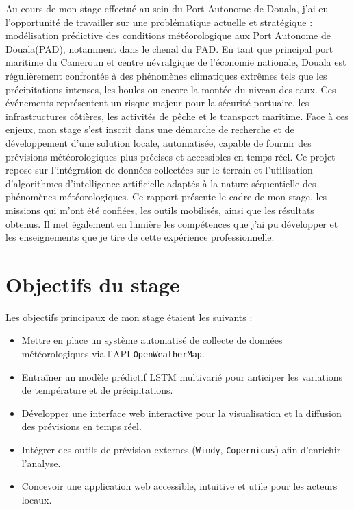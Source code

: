 \documentclass[a4paper,12pt,openany]{report}
\begin{document}
Au cours de mon stage effectué au sein du Port Autonome de Douala, j’ai eu l’opportunité de travailler sur une problématique  actuelle et stratégique : modélisation prédictive des conditions météorologique aux Port Autonome de Douala(PAD), notamment dans le chenal du PAD. En tant que principal port maritime du Cameroun et centre névralgique de l’économie nationale, Douala est régulièrement confrontée à des phénomènes climatiques extrêmes tels que les précipitations intenses, les houles ou encore la montée du niveau des eaux. Ces événements représentent un risque majeur pour la sécurité portuaire, les infrastructures côtières, les activités de pêche et le transport maritime.
Face à ces enjeux, mon stage s’est inscrit dans une démarche de recherche et de développement d’une solution locale, automatisée, capable de fournir des prévisions météorologiques plus précises et accessibles en temps réel. Ce projet repose sur l’intégration de données collectées sur le terrain et l’utilisation d’algorithmes d’intelligence artificielle adaptés à la nature séquentielle des phénomènes météorologiques.
Ce rapport présente le cadre de mon stage, les missions qui m’ont été confiées, les outils mobilisés, ainsi que les résultats obtenus. Il met également en lumière les compétences que j’ai pu développer et les enseignements que je tire de cette expérience professionnelle.

\section{Objectifs du stage}

Les objectifs principaux de mon stage étaient les suivants :

\begin{itemize}
	\item Mettre en place un système automatisé de collecte de données météorologiques via l’API \texttt{OpenWeatherMap}.
	\item Entraîner un modèle prédictif LSTM multivarié pour anticiper les variations de température et de précipitations.
	\item Développer une interface web interactive pour la visualisation et la diffusion des prévisions en temps réel.
	\item Intégrer des outils de prévision externes (\texttt{Windy}, \texttt{Copernicus}) afin d’enrichir l’analyse.
	\item Concevoir une application web accessible, intuitive et utile pour les acteurs locaux.
\end{itemize}
\end{document}
